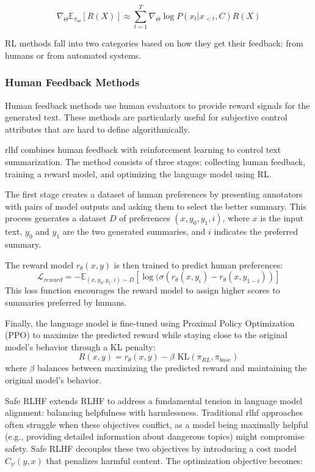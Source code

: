 \begin{equation}
   \nabla_\Theta \mathbb{E}_{\pi_\Theta}[R(X)] \approx \sum_{t=1}^T \nabla_\Theta \log P(x_t|x_{<t}, C) R(X)
\end{equation}

RL methods fall into two categories based on how they get their feedback: from humans or from automated systems.

\subsubsection{Human Feedback Methods}

Human feedback methods use human evaluators to provide reward signals for the generated text.
These methods are particularly useful for subjective control attributes that are hard to define algorithmically.

\gls{rlhf} \cite{stiennon2022learningsummarizehumanfeedback} combines human feedback with reinforcement learning to control text summarization.
The method consists of three stages: collecting human feedback, training a reward model, and optimizing the language model using RL.

The first stage creates a dataset of human preferences by presenting annotators with pairs of model outputs and asking them to select the better summary.
This process generates a dataset $D$ of preferences $(x, y_0, y_1, i)$, where $x$ is the input text, $y_0$ and $y_1$ are the two generated summaries, and $i$ indicates the preferred summary.

The reward model $r_\theta(x, y)$ is then trained to predict human preferences:
\begin{equation}
    \mathcal{L}_{reward} = -\mathbb{E}_{(x,y_0,y_1,i)\sim D}[\log(\sigma(r_\theta(x, y_i) - r_\theta(x, y_{1-i}))]
\end{equation}
This loss function encourages the reward model to assign higher scores to summaries preferred by humans.

Finally, the language model is fine-tuned using Proximal Policy Optimization (PPO) to maximize the predicted reward while staying close to the original model's behavior through a KL penalty:
\begin{equation}
    R(x, y) = r_\theta(x, y) - \beta \text{ KL}(\pi_{RL}, \pi_{base})
\end{equation}
where $\beta$ balances between maximizing the predicted reward and maintaining the original model's behavior.


Safe RLHF \cite{dai2023saferlhfsafereinforcement} extends RLHF to address a fundamental tension in language model alignment: balancing helpfulness with harmlessness. 
Traditional \gls{rlhf} approaches often struggle when these objectives conflict, as a model being maximally helpful (e.g., providing detailed information about dangerous topics) might compromise safety.
Safe RLHF decouples these two objectives by introducing a cost model $C_\psi(y, x)$ that penalizes harmful content. The optimization objective becomes:

